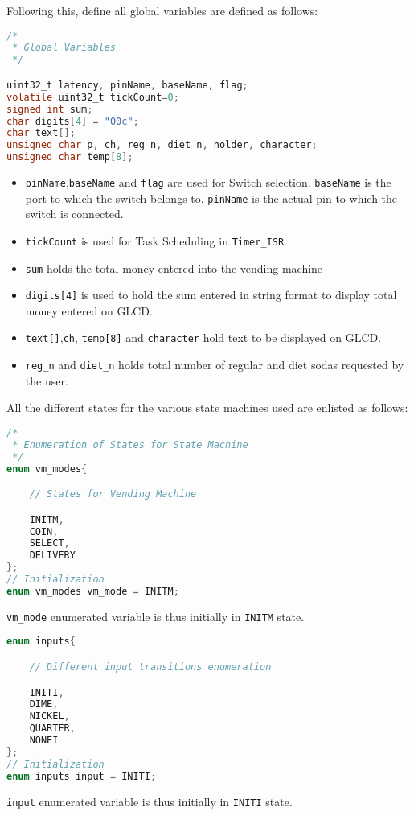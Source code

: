 \documentclass{article}
\begin{document}
\newpage
\qquad Following this, define all global variables are defined as follows:
  \begin{lstlisting}[basicstyle = \small, language = C]
/*
 * Global Variables
 */

uint32_t latency, pinName, baseName, flag;
volatile uint32_t tickCount=0;
signed int sum;
char digits[4] = "00c";
char text[];
unsigned char p, ch, reg_n, diet_n, holder, character;
unsigned char temp[8];
  \end{lstlisting}
\begin{itemize}
  \item \texttt{pinName},\texttt{baseName} and \texttt{flag} are used for Switch selection. \texttt{baseName} is the port to which the switch belongs to. \texttt{pinName} is the actual pin to which the switch is connected.
  \item \texttt{tickCount} is used for Task Scheduling in \texttt{Timer\_ISR}.
  \item \texttt{sum} holds the total money entered into the vending machine
  \item \texttt{digits[4]} is used to hold the sum entered in string format to display total money entered on GLCD.
  \item \texttt{text[]},\texttt{ch}, \texttt{temp[8]} and \texttt{character} hold text to be displayed on GLCD.
  \item \texttt{reg\_n} and \texttt{diet\_n} holds total number of regular and diet sodas requested by the user.
\end{itemize}
\qquad All the different states for the various state machines used are enlisted as follows:
  \begin{lstlisting}[basicstyle = \small, language = C]
/*
 * Enumeration of States for State Machine
 */
enum vm_modes{

    // States for Vending Machine

    INITM,
    COIN,
    SELECT,
    DELIVERY
};
// Initialization
enum vm_modes vm_mode = INITM;
  \end{lstlisting}
  \texttt{vm\_mode} enumerated variable is thus initially in \texttt{INITM} state.
    \begin{lstlisting}[basicstyle = \small, language = C]
  enum inputs{

    // Different input transitions enumeration

    INITI,
    DIME,
    NICKEL,
    QUARTER,
    NONEI
};
// Initialization
enum inputs input = INITI;
  \end{lstlisting}
    \texttt{input} enumerated variable is thus initially in \texttt{INITI} state.
\end{document}
